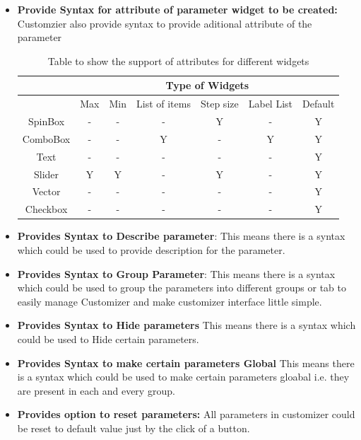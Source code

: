 \begin{itemize}
\begin{enumerate}
	\end{enumerate}
	
	\item \textbf{Provide Syntax for attribute of parameter widget to be created:} 
	Customzier also provide syntax to provide aditional attribute of the parameter
	
	\begin{table}[h]
		\centering
		\begin{tabular}{ |c|c|c|c|c|c|c| }
			\hline
			& \multicolumn{6}{|c|}{Type of Widgets} \\
			\hline
			&Max&	Min &	List of items&	Step size&	Label List	 &Default	 \\ [0.5ex]
			\hline 
			SpinBox& -&	-&	-&	Y&	 -& Y \\ \hline
			ComboBox&	-&	-&	Y&	-&	Y&Y \\ \hline
			Text&	-&	-&	-&	-&	-&Y \\ \hline
			Slider&	Y&	Y&	-&	Y&	-&Y \\ \hline
			Vector&	-&	-&	-&	-&	-&Y \\ \hline
			Checkbox&	-&	-&	-&	-&	-&Y \\ [1ex]
			\hline
		\end{tabular}
		\caption{Table to show the support of attributes  for different widgets}
		\label{table2}
	\end{table}
	
	\item {\bf Provides Syntax to Describe parameter}: 
	This means there is a syntax which could be used to provide description for the parameter.
	
	\item \textbf{Provides Syntax to Group Parameter}:
	This means there is a syntax which could be used to group the parameters into different groups or tab to easily manage Customizer and make customizer interface little simple.
	
	\item \textbf{Provides Syntax to Hide parameters}
	This means there is a syntax which could be used to Hide certain parameters.
	
	\item \textbf{Provides Syntax to make certain parameters Global}
	This means there is a syntax which could be used to make certain parameters gloabal i.e. they are present in each and every group.

	\item \textbf{Provides option to reset parameters:}
	All parameters in customizer could be reset to default value just by the click of a button.


\end{itemize}
